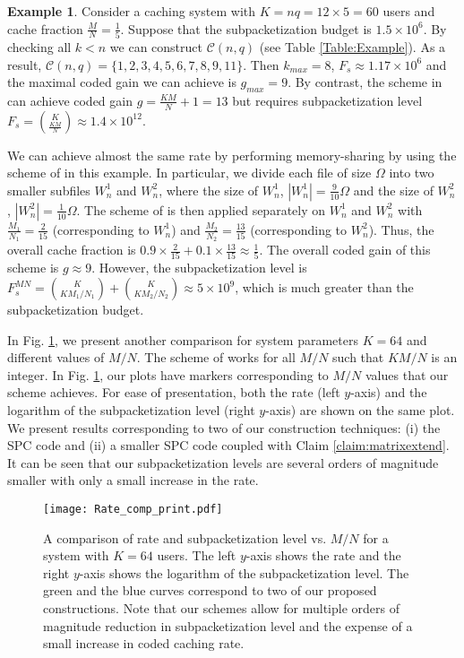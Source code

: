 \documentclass[journal,twocolumn]{IEEEtran}
\theoremstyle{definition}
\newtheorem{example}{Example}
\newcommand{\calC}{\mathcal{C}}
\newcommand{\litang}[1]{\marginpar{+}{\bf Li's remark}: {\em #1}}
\begin{document}
\begin{example}
\label{eg:discuss_comp_1}
	Consider a caching system with $K=nq=12\times 5=60$ users and cache fraction $\frac{M}{N}=\frac{1}{5}$. Suppose that the subpacketization budget is $1.5\times 10^6$. By checking all $k<n$ we can construct $\calC(n,q)$ (see Table \ref{Table:Example}). %
As a result, $\calC(n,q)=\{1,2,3,4,5,6,7,8,9,11\}$. Then $k_{max}=8$, $F_s\approx 1.17\times 10^6$ and the maximal coded gain we can achieve is $g_{max}=9$. By contrast, the scheme in \cite{maddahN14} can achieve coded gain $g=\frac{KM}{N}+1=13$ but requires subpacketization level $F_s=\binom{K}{\frac{KM}{N}}\approx 1.4\times 10^{12}$.

We can achieve almost the same rate by performing memory-sharing by using the scheme of \cite{maddahN14} in this example. In particular, we divide each file of size $\Omega$ into two smaller subfiles $W_n^1$ and $W_n^2$, where the size of $W_n^1$, $|W_n^1|=\frac{9}{10} \Omega$ and the size of $W_n^2$, $|W_n^2|=\frac{1}{10}\Omega$. The scheme of \cite{maddahN14} is then applied separately on $W_n^1$ and $W_n^2$ with $\frac{M_1}{N_1}=\frac{2}{15}$ (corresponding to $W_n^1$) and $\frac{M_2}{N_2}=\frac{13}{15}$ (corresponding to $W_n^2$). Thus, the overall cache fraction is $0.9 \times \frac{2}{15} + 0.1 \times \frac{13}{15} \approx \frac{1}{5}$. The overall coded gain of this scheme is $g \approx 9$. However, the subpacketization level is $F_s^{MN} = \binom{K}{KM_1/N_1} + \binom{K}{KM_2/N_2}\approx 5\times 10^9$, which is much greater than the subpacketization budget.
\end{example}

In Fig. \ref{fig:rate_comps}, we present another comparison for system parameters $K=64$ and different values of $M/N$. The scheme of \cite{maddahN14} works for all $M/N$ such that $KM/N$ is an integer. In Fig. \ref{fig:rate_comps}, our plots have markers corresponding to $M/N$ values that our scheme achieves. For ease of presentation, both the rate (left $y$-axis) and the logarithm of the subpacketization level (right $y$-axis) are shown on the same plot. We present results corresponding to two of our construction techniques: (i) the SPC code and (ii) a smaller SPC code coupled with Claim \ref{claim:matrixextend}. It can be seen that our subpacketization levels are several orders of magnitude smaller with only a small increase in the rate.

\begin{figure}[!t]
		\centering
		\texttt{[image: Rate\_comp\_print.pdf]}
		\caption{A comparison of rate and subpacketization level vs. $M/N$ for a system with $K=64$ users. The left $y$-axis shows the rate and the right $y$-axis shows the logarithm of the subpacketization level. The green and the blue curves correspond to two of our proposed constructions. Note that our schemes allow for multiple orders of magnitude reduction in subpacketization level and the expense of a small increase in coded caching rate.}
		\label{fig:rate_comps}
\end{figure}
\end{document}
